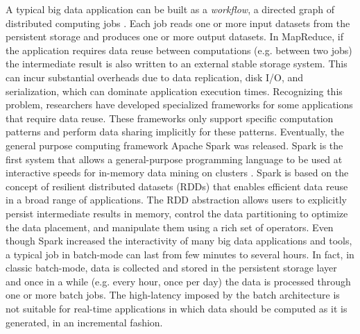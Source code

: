 A typical big data application can be built as a \emph{workflow}, a directed graph of distributed computing jobs \cite{bigdataatlinkedin}. Each job reads one or more input datasets from the persistent storage and produces one or more output datasets. In MapReduce, if the application requires data reuse between computations (e.g. between two jobs) the intermediate result is also written to an external stable storage system. This can incur substantial overheads due to data replication, disk I/O, and serialization, which can dominate application execution times. Recognizing this problem, researchers have developed specialized frameworks for some applications that require data reuse. These frameworks only support specific computation patterns and perform data sharing implicitly for these patterns. Eventually, the general purpose computing framework Apache Spark \cite{apachespark} was released. Spark is the first system that allows a general-purpose programming language to be used at interactive speeds for in-memory data mining on clusters \cite{apachespark}. Spark is based on the concept of resilient distributed datasets (RDDs) \cite{apachesparkrdd} that enables efficient data reuse in a broad range of applications. The RDD abstraction allows users to explicitly persist intermediate results in memory, control the data partitioning to optimize the data placement, and manipulate them using a rich set of operators. Even though Spark increased the interactivity of many big data applications and tools, a typical job in batch-mode can last from few minutes to several hours. In fact, in classic batch-mode, data is collected and stored in the persistent storage layer and once in a while (e.g. every hour, once per day) the data is processed through one or more batch jobs. The high-latency imposed by the batch architecture is not suitable for real-time applications in which data should be computed as it is generated, in an incremental fashion.

